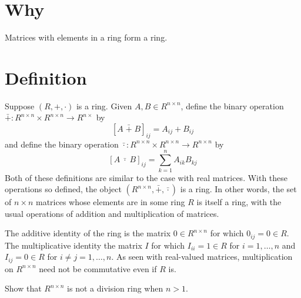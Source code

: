 
\section*{Why}

Matrices with elements in a ring form a ring.

\section*{Definition}

Suppose $(R, +, \cdot )$ is a ring.
Given $A, B \in R^{n \times  n}$, define the binary operation $\bar{+}: R^{n \times  n} \times  R^{n \times  n} \to R^{n \times  }$ by
\[
\left[A \; \bar{+} \; B\right]_{ij} = A_{ij} + B_{ij}
\]
and define the binary operation $\bar{\cdot }: R^{n \times  n} \times  R^{n \times  n} \to R^{n \times  n}$ by
\[
\left[A \; \bar{\cdot } \; B\right]_{ij} = \sum_{k = 1}^{n} A_{ik}B_{kj}
\]
Both of these definitions are similar to the case with real matrices.
With these operations so defined, the object $(R^{n \times  n}, \bar{+}, \bar{\cdot })$ is a ring.
In other words, the set of $n \times  n$ matrices whose elements are in some ring $R$ is itself a ring, with the usual operations of addition and multiplication of matrices.

The additive identity of the ring is the matrix $0 \in R^{n \times  n}$ for which $0_{ij} = 0 \in R$.
The multiplicative identity the matrix $I$ for which $I_{ii} = 1 \in R$ for $i = 1, \dots , n$ and $I_{ij} = 0 \in R$ for $i \neq j = 1, \dots , n$.
As seen with real-valued matrices, multiplication on $R^{n \times  n}$ need not be commutative even if $R$ is.

\begin{exercise}
Show that $R^{n \times  n}$ is not a division ring when $n > 1$.
\end{exercise}

\blankpage